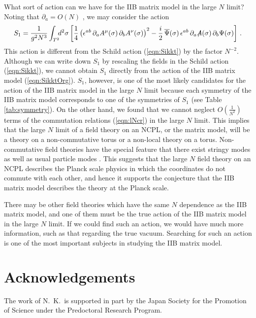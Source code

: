 \documentclass[12pt,a4paper]{article}
\newcommand{\Slash}[1]{\ooalign{\hfil/\hfil\crcr$#1$}}
\begin{document}
What sort of action can we have for the IIB matrix model in the
large $N$ limit?  Noting that $\partial_a = O(N)$ \cite{KU}, we
may consider the action
\begin{equation}
  S_1=\frac{1}{g^2N^3}\int_{T^2}\hspace{-1ex}d^2\sigma
	\left[\frac{1}{4}\left(\epsilon^{ab}\,
	\partial_aA^\mu(\sigma)\,\partial_bA^\nu(\sigma)\right)^2
	-\frac{i}{2}\,{\overline\Psi}(\sigma)\,\epsilon^{ab}\,
	\partial_a{\Slash A}(\sigma)\,\partial_b\Psi(\sigma)\right]\,.
	\label{eqn:Schild-2}
\end{equation}
This action is different from the Schild action (\ref{eqn:Sikkt}) by
the factor $N^{-2}$.
Although we can write down $S_1$ by rescaling the fields in the Schild
action (\ref{eqn:Sikkt}), we cannot obtain $S_1$ directly from the
action of the IIB matrix model (\ref{eqn:SikktOrg}).
$S_1$, however, is one of the most likely candidates for the
action of the IIB matrix model in the large $N$ limit because each
symmetry of the IIB matrix model corresponds to one of the symmetries
of $S_1$ (see Table \ref{tab:symmetry}).
On the other hand, we found that we cannot neglect
$O(\frac{1}{N^2})$ terms of the commutation relations (\ref{eqn:lNcr})
in the large $N$ limit. This implies that the large $N$ limit of a
field theory on an NCPL, or the matrix model, will be a theory on a
non-commutative torus or a non-local theory on a torus.
Non-commutative field theories have the special feature that there
exist stringy modes as well as usual particle modes \cite{NCG}.
This suggests that the large $N$ field theory on an NCPL
describes the Planck scale physics in which the coordinates
do not commute with each other, and hence it supports the
conjecture that the IIB matrix model describes the theory at the
Planck scale.

There may be other field theories which have the same $N$
dependence as the IIB matrix model, and one of them must be the
true action of the IIB matrix model in the large $N$ limit.
If we could find such an action, we would have much more information,
such as that regarding the true vacuum.
Searching for such an action is one of the most important subjects in
studying the IIB matrix model.

\section*{Acknowledgements}
The work of N.\ K.\ is supported in part by the Japan Society for the
Promotion of Science under the Predoctoral Research Program.
\end{document}
